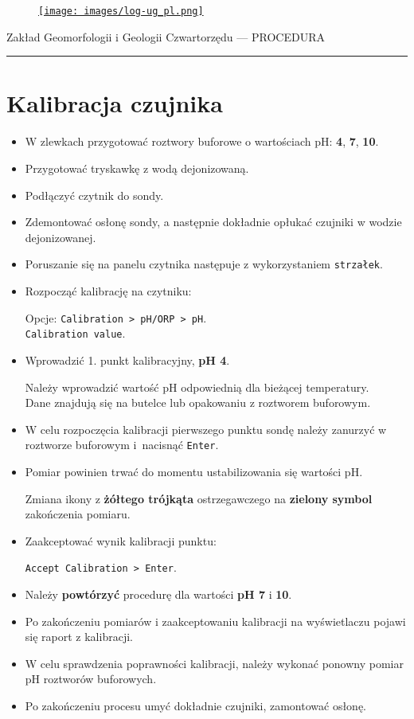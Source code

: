 \documentclass[
  letterpaper,
  DIV=11,
  numbers=noendperiod]{scrreprt}
\begin{document}
\begin{figure}

\href{https://geomorfologia.ug.edu.pl}{\texttt{[image: images/log-ug\_pl.png]}}

\end{figure}

Zakład Geomorfologii i Geologii Czwartorzędu --- PROCEDURA

\begin{center}\rule{0.5\linewidth}{0.5pt}\end{center}

\hypertarget{kalibracja}{%
\section{Kalibracja czujnika}\label{kalibracja}}

\begin{itemize}
\item
  W zlewkach przygotować roztwory buforowe o wartościach pH: \textbf{4},
  \textbf{7}, \textbf{10}.
\item
  Przygotować tryskawkę z wodą dejonizowaną.
\item
  Podłączyć czytnik do sondy.
\item
  Zdemontować osłonę sondy, a następnie dokładnie opłukać czujniki w
  wodzie dejonizowanej.
\item
  Poruszanie się na panelu czytnika następuje z wykorzystaniem
  \texttt{strzałek}.
\item
  Rozpocząć kalibrację na czytniku:

  Opcje:
  \texttt{Calibration\ \textgreater{}\ pH/ORP\ \textgreater{}\ pH}.\\
  \texttt{Calibration\ value}.
\item
  Wprowadzić 1. punkt kalibracyjny, \textbf{pH 4}.

  Należy wprowadzić wartość pH odpowiednią dla bieżącej temperatury.\\
  Dane znajdują się na butelce lub opakowaniu z roztworem buforowym.
\item
  W celu rozpoczęcia kalibracji pierwszego punktu sondę należy zanurzyć
  w roztworze buforowym i~nacisnąć \texttt{Enter}.
\item
  Pomiar powinien trwać do momentu ustabilizowania się wartości pH.

  Zmiana ikony z \textbf{żółtego trójkąta} ostrzegawczego na
  \textbf{zielony symbol} zakończenia pomiaru.
\item
  Zaakceptować wynik kalibracji punktu:

  \texttt{Accept\ Calibration\ \textgreater{}\ Enter}.
\item
  Należy \textbf{powtórzyć} procedurę dla wartości \textbf{pH 7} i
  \textbf{10}.
\item
  Po zakończeniu pomiarów i zaakceptowaniu kalibracji na wyświetlaczu
  pojawi się raport z kalibracji.
\item
  W celu sprawdzenia poprawności kalibracji, należy wykonać ponowny
  pomiar pH roztworów buforowych.
\item
  Po zakończeniu procesu umyć dokładnie czujniki, zamontować osłonę.
\end{itemize}
\end{document}
